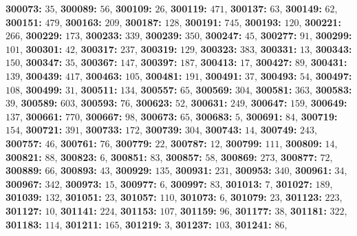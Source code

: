\textsf{\bfseries 300073:} $35$, \textsf{\bfseries 300089:} $56$, \textsf{\bfseries 300109:} $26$, \textsf{\bfseries 300119:} $471$, \textsf{\bfseries 300137:} $63$, \textsf{\bfseries 300149:} $62$, \textsf{\bfseries 300151:} $479$, \textsf{\bfseries 300163:} $209$, \textsf{\bfseries 300187:} $128$, \textsf{\bfseries 300191:} $745$, \textsf{\bfseries 300193:} $120$, \textsf{\bfseries 300221:} $266$, \textsf{\bfseries 300229:} $173$, \textsf{\bfseries 300233:} $339$, \textsf{\bfseries 300239:} $350$, \textsf{\bfseries 300247:} $45$, \textsf{\bfseries 300277:} $91$, \textsf{\bfseries 300299:} $101$, \textsf{\bfseries 300301:} $42$, \textsf{\bfseries 300317:} $237$, \textsf{\bfseries 300319:} $129$, \textsf{\bfseries 300323:} $383$, \textsf{\bfseries 300331:} $13$, \textsf{\bfseries 300343:} $150$, \textsf{\bfseries 300347:} $35$, \textsf{\bfseries 300367:} $147$, \textsf{\bfseries 300397:} $187$, \textsf{\bfseries 300413:} $17$, \textsf{\bfseries 300427:} $89$, \textsf{\bfseries 300431:} $139$, \textsf{\bfseries 300439:} $417$, \textsf{\bfseries 300463:} $105$, \textsf{\bfseries 300481:} $191$, \textsf{\bfseries 300491:} $37$, \textsf{\bfseries 300493:} $54$, \textsf{\bfseries 300497:} $108$, \textsf{\bfseries 300499:} $31$, \textsf{\bfseries 300511:} $134$, \textsf{\bfseries 300557:} $65$, \textsf{\bfseries 300569:} $304$, \textsf{\bfseries 300581:} $363$, \textsf{\bfseries 300583:} $39$, \textsf{\bfseries 300589:} $603$, \textsf{\bfseries 300593:} $76$, \textsf{\bfseries 300623:} $52$, \textsf{\bfseries 300631:} $249$, \textsf{\bfseries 300647:} $159$, \textsf{\bfseries 300649:} $137$, \textsf{\bfseries 300661:} $770$, \textsf{\bfseries 300667:} $98$, \textsf{\bfseries 300673:} $65$, \textsf{\bfseries 300683:} $5$, \textsf{\bfseries 300691:} $84$, \textsf{\bfseries 300719:} $154$, \textsf{\bfseries 300721:} $391$, \textsf{\bfseries 300733:} $172$, \textsf{\bfseries 300739:} $304$, \textsf{\bfseries 300743:} $14$, \textsf{\bfseries 300749:} $243$, \textsf{\bfseries 300757:} $46$, \textsf{\bfseries 300761:} $76$, \textsf{\bfseries 300779:} $22$, \textsf{\bfseries 300787:} $12$, \textsf{\bfseries 300799:} $111$, \textsf{\bfseries 300809:} $14$, \textsf{\bfseries 300821:} $88$, \textsf{\bfseries 300823:} $6$, \textsf{\bfseries 300851:} $83$, \textsf{\bfseries 300857:} $58$, \textsf{\bfseries 300869:} $273$, \textsf{\bfseries 300877:} $72$, \textsf{\bfseries 300889:} $66$, \textsf{\bfseries 300893:} $43$, \textsf{\bfseries 300929:} $135$, \textsf{\bfseries 300931:} $231$, \textsf{\bfseries 300953:} $340$, \textsf{\bfseries 300961:} $34$, \textsf{\bfseries 300967:} $342$, \textsf{\bfseries 300973:} $15$, \textsf{\bfseries 300977:} $6$, \textsf{\bfseries 300997:} $83$, \textsf{\bfseries 301013:} $7$, \textsf{\bfseries 301027:} $189$, \textsf{\bfseries 301039:} $132$, \textsf{\bfseries 301051:} $23$, \textsf{\bfseries 301057:} $110$, \textsf{\bfseries 301073:} $6$, \textsf{\bfseries 301079:} $23$, \textsf{\bfseries 301123:} $223$, \textsf{\bfseries 301127:} $10$, \textsf{\bfseries 301141:} $224$, \textsf{\bfseries 301153:} $107$, \textsf{\bfseries 301159:} $96$, \textsf{\bfseries 301177:} $38$, \textsf{\bfseries 301181:} $322$, \textsf{\bfseries 301183:} $114$, \textsf{\bfseries 301211:} $165$, \textsf{\bfseries 301219:} $3$, \textsf{\bfseries 301237:} $103$, \textsf{\bfseries 301241:} $86$, 
